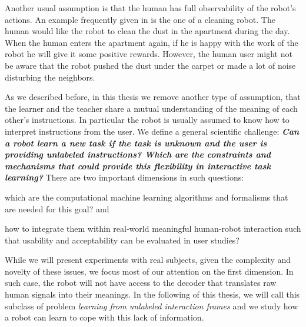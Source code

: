 Another usual assumption is that the human has full observability of the robot's actions. An example frequently given in \cite{cederborg2014thesis} is the one of a cleaning robot. The human would like the robot to clean the dust in the apartment during the day. When the human enters the apartment again, if he is happy with the work of the robot he will give it some positive rewards. However, the human user might not be aware that the robot pushed the dust under the carpet or made a lot of noise disturbing the neighbors.


As we described before, in this thesis we remove another type of assumption, that the learner and the teacher share a mutual understanding of the meaning of each other's instructions.  In particular the robot is usually assumed to know how to interpret instructions from the user. We define a general scientific challenge: \textbf{\textit{Can a robot learn a new task if the task is unknown and the user is providing unlabeled instructions? Which are the constraints and mechanisms that could provide this flexibility in interactive task learning?}} There are two important dimensions in such questions: \begin{inparaenum} \item which are the computational machine learning algorithms and formalisms that are needed for this goal? and \item how to integrate them within real-world meaningful human-robot interaction such that usability and acceptability can be evaluated in user studies? \end{inparaenum}  While we will present experiments with real subjects, given the complexity and novelty of these issues, we focus most of our attention on the first dimension. In such case, the robot will not have access to the decoder that translates raw human signals into their meanings. In the following of this thesis, we will call this subclass of problem \emph{learning from unlabeled interaction frames} and we study how a robot can learn to cope with this lack of information.

